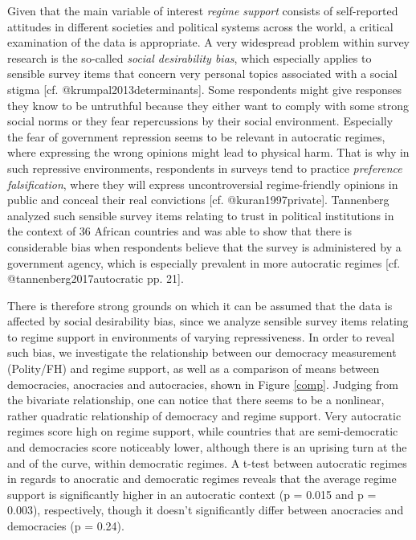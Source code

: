 \documentclass[]{article}
\begin{document}
Given that the main variable of interest \textit{regime support}
consists of self-reported attitudes in different societies and political
systems across the world, a critical examination of the data is
appropriate. A very widespread problem within survey research is the
so-called \textit{social desirability bias}, which especially applies to
sensible survey items that concern very personal topics associated with
a social stigma {[}cf. @krumpal2013determinants{]}. Some respondents
might give responses they know to be untruthful because they either want
to comply with some strong social norms or they fear repercussions by
their social environment. Especially the fear of government repression
seems to be relevant in autocratic regimes, where expressing the wrong
opinions might lead to physical harm. That is why in such repressive
environments, respondents in surveys tend to practice
\textit{preference falsification}, where they will express
uncontroversial regime-friendly opinions in public and conceal their
real convictions {[}cf. @kuran1997private{]}. Tannenberg analyzed such
sensible survey items relating to trust in political institutions in the
context of 36 African countries and was able to show that there is
considerable bias when respondents believe that the survey is
administered by a government agency, which is especially prevalent in
more autocratic regimes {[}cf. @tannenberg2017autocratic pp. 21{]}.

There is therefore strong grounds on which it can be assumed that the
data is affected by social desirability bias, since we analyze sensible
survey items relating to regime support in environments of varying
repressiveness. In order to reveal such bias, we investigate the
relationship between our democracy measurement (Polity/FH) and regime
support, as well as a comparison of means between democracies,
anocracies and autocracies, shown in Figure \ref{comp}. Judging from the
bivariate relationship, one can notice that there seems to be a
nonlinear, rather quadratic relationship of democracy and regime
support. Very autocratic regimes score high on regime support, while
countries that are semi-democratic and democracies score noticeably
lower, although there is an uprising turn at the and of the curve,
within democratic regimes. A t-test between autocratic regimes in
regards to anocratic and democratic regimes reveals that the average
regime support is significantly higher in an autocratic context (p =
0.015 and p = 0.003), respectively, though it doesn't significantly
differ between anocracies and democracies (p = 0.24).
\end{document}
